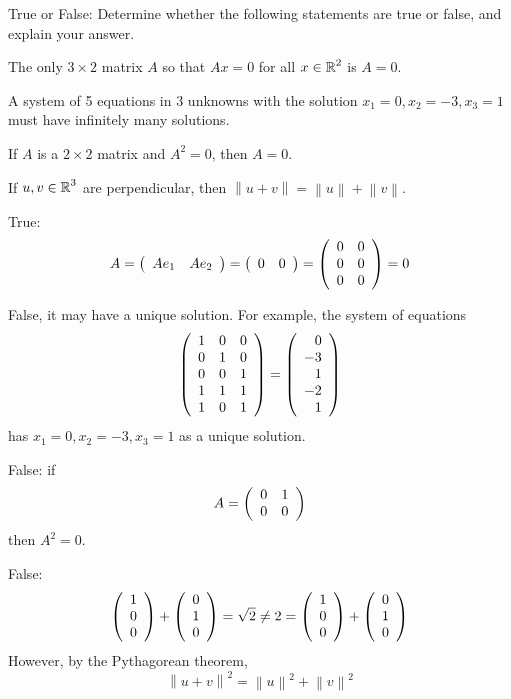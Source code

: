 \documentclass{ximera}
\begin{document}
\begin{exercise} \label{A3.7.2}
True or False: Determine whether the following statements are true or false, and explain your answer.
\begin{enumeratea}
\item The only $3\times 2$ matrix $A$ so that $Ax = 0 $ for all $x \in \mbox{$\Bbb{R}$}^2$ is $A=0$.

\item A system of 5 equations in 3 unknowns with the solution $x_1=0, x_2=-3,x_3=1$ must have infinitely many solutions.

\item If $A$ is a $2\times 2$ matrix and $A^2=0$, then $A=0$.

\item  If $u,v\in \mbox{$\Bbb{R}$}^3$ are perpendicular, then $\left\| u + v \right\| =\left\| u \right\|+\left\| v \right\|$.  

\end{enumeratea}

\begin{solution}
\begin{enumeratea}
\item True:
\[
A=\left(\begin{array}{rrrrrrrrrrrrrrrrrr}  A e_1 & A e_2 \end{array}\right)=\left(\begin{array}{rrrrrrrrrrrrrrrrrr} 0 & 0 \end{array}\right)=\left(\begin{array}{rrrrrrrrrrrrrrrrrr}  0 & 0 \\ 0 & 0 \\ 0 & 0 \end{array}\right)=0
\]
\item False, it may have a unique solution. For example, the system of equations
\[
\left(\begin{array}{rrrrrrrrrrrrrrrrrr}  1 & 0 & 0\\ 0 & 1 & 0 \\ 0 & 0 & 1 \\ 1 & 1 & 1 \\ 1 & 0 & 1 \end{array}\right) = \left(\begin{array}{rrrrrrrrrrrrrrrrrr}  0 \\ -3 \\ 1 \\ -2 \\ 1 \end{array}\right)
\]
has $x_1=0, x_2=-3,x_3=1$ as a unique solution.
\item False: if 
\[
A=\left(\begin{array}{rrrrrrrrrrrrrrrrrr} 0 & 1 \\ 0 & 0 \end{array}\right)
\]
then $A^2=0$.
\item False:
\[
\left(\begin{array}{rrrrrrrrrrrrrrrrrr}  1 \\ 0 \\ 0 \end{array}\right) + \left(\begin{array}{rrrrrrrrrrrrrrrrrr}  0 \\ 1 \\ 0 \end{array}\right) = \sqrt{2}\neq 2 = \left(\begin{array}{rrrrrrrrrrrrrrrrrr}  1 \\ 0 \\ 0 \end{array}\right) + \left(\begin{array}{rrrrrrrrrrrrrrrrrr} 0 \\ 1 \\ 0 \end{array}\right)
\]
However, by the Pythagorean theorem, 
\[
\left\|u + v \right\|^2=\left\| u \right\|^2+\left\| v \right\|^2 
\]
\end{enumeratea}
\end{solution}

\end{exercise}
\end{document}
